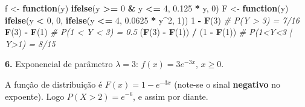 \documentclass[
  portuguese,
  11pt,
  openany]{book}
\newenvironment{Shaded}{\begin{snugshade}}{\end{snugshade}}
\newcommand{\CommentTok}[1]{\textcolor[rgb]{0.56,0.35,0.01}{\textit{#1}}}
\newcommand{\ConstantTok}[1]{\textcolor[rgb]{0.56,0.35,0.01}{#1}}
\newcommand{\ControlFlowTok}[1]{\textcolor[rgb]{0.13,0.29,0.53}{\textbf{#1}}}
\newcommand{\DecValTok}[1]{\textcolor[rgb]{0.00,0.00,0.81}{#1}}
\newcommand{\FloatTok}[1]{\textcolor[rgb]{0.00,0.00,0.81}{#1}}
\newcommand{\FunctionTok}[1]{\textcolor[rgb]{0.13,0.29,0.53}{\textbf{#1}}}
\newcommand{\NormalTok}[1]{#1}
\newcommand{\OtherTok}[1]{\textcolor[rgb]{0.56,0.35,0.01}{#1}}
\newcommand{\SpecialCharTok}[1]{\textcolor[rgb]{0.81,0.36,0.00}{\textbf{#1}}}
\begin{document}
\begin{Shaded}
\begin{Highlighting}[]
\NormalTok{f }\OtherTok{\textless{}{-}} \ControlFlowTok{function}\NormalTok{(y) }\FunctionTok{ifelse}\NormalTok{(y }\SpecialCharTok{\textgreater{}=} \DecValTok{0} \SpecialCharTok{\&}\NormalTok{ y }\SpecialCharTok{\textless{}=} \DecValTok{4}\NormalTok{, }\FloatTok{0.125} \SpecialCharTok{*}\NormalTok{ y, }\DecValTok{0}\NormalTok{)}
\NormalTok{F }\OtherTok{\textless{}{-}} \ControlFlowTok{function}\NormalTok{(y) }\FunctionTok{ifelse}\NormalTok{(y }\SpecialCharTok{\textless{}} \DecValTok{0}\NormalTok{, }\DecValTok{0}\NormalTok{, }\FunctionTok{ifelse}\NormalTok{(y }\SpecialCharTok{\textless{}=} \DecValTok{4}\NormalTok{, }\FloatTok{0.0625} \SpecialCharTok{*}\NormalTok{ y}\SpecialCharTok{\^{}}\DecValTok{2}\NormalTok{, }\DecValTok{1}\NormalTok{))}
\DecValTok{1} \SpecialCharTok{{-}} \FunctionTok{F}\NormalTok{(}\DecValTok{3}\NormalTok{)                            }\CommentTok{\# P(Y \textgreater{} 3) = 7/16}
\FunctionTok{F}\NormalTok{(}\DecValTok{3}\NormalTok{) }\SpecialCharTok{{-}} \FunctionTok{F}\NormalTok{(}\DecValTok{1}\NormalTok{)                         }\CommentTok{\# P(1 \textless{} Y \textless{} 3) = 0.5}
\NormalTok{(}\FunctionTok{F}\NormalTok{(}\DecValTok{3}\NormalTok{) }\SpecialCharTok{{-}} \FunctionTok{F}\NormalTok{(}\DecValTok{1}\NormalTok{)) }\SpecialCharTok{/}\NormalTok{ (}\DecValTok{1} \SpecialCharTok{{-}} \FunctionTok{F}\NormalTok{(}\DecValTok{1}\NormalTok{))          }\CommentTok{\# P(1\textless{}Y\textless{}3 | Y\textgreater{}1) = 8/15}
\end{Highlighting}
\end{Shaded}

\textbf{6.} Exponencial de parâmetro \(\lambda = 3\): \(f(x) = 3e^{-3x}\), \(x \ge 0\).

A função de distribuição é \(F(x) = 1 - e^{-3x}\) (note-se o sinal \textbf{negativo} no
expoente). Logo \(P(X > 2) = e^{-6}\), e assim por diante.

\begin{Shaded}
\end{Shaded}
\end{document}
